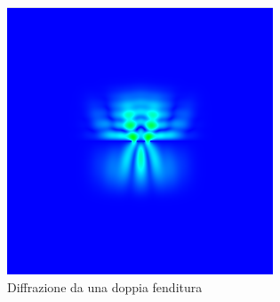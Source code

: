  \begin{figure}[!h]
\centering   
 \includegraphics[width=0.5\columnwidth]{fenditura5.png}
 \caption{\small{Diffrazione da una doppia fenditura}}
 \end{figure}
 
 \pagebreak
 
 
